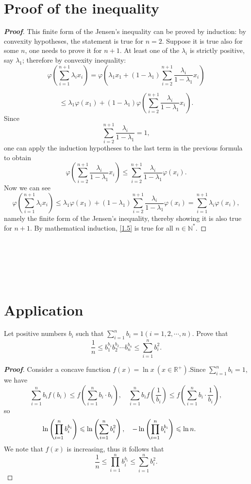 \documentclass{memoir}
\begin{document}
\section{Proof of the inequality}
\begin{proof}[\textbf{Proof}]
This finite form of the Jensen's inequality can be proved by induction: by convexity hypotheses, the statement is true for $n = 2$. Suppose it is true also for some $n$, one needs to prove it for $n+1$. At least one of the $\lambda_i$ is strictly positive, say $\lambda_1$; therefore by convexity inequality:
\[\varphi \left(\sum_{i=1}^{n+1} \lambda_i x_i \right) = \varphi\left(\lambda_1x_1+(1-\lambda _{1})\sum \limits^{n+1}_{i=2}\frac{\lambda _{i}}{1-\lambda _{1}} x_{i}\right)\]

\[\leqslant \lambda_1\varphi(x_1)+(1-\lambda _{1})\varphi\left(\sum \limits^{n+1}_{i=2}\frac{\lambda _{i}}{1-\lambda _{1}} x_{i}\right).\]
Since
\[\sum \limits^{n+1}_{i=2}\frac{\lambda _{i}}{1-\lambda _{1}} =1,\]
one can apply the induction hypotheses to the last term in the previous formula to obtain
\[\varphi\left(\sum \limits^{n+1}_{i=2}\frac{\lambda _{i}}{1-\lambda _{1}} x_{i}\right)\leqslant
\sum\limits^{n+1}_{i=2}\frac{\lambda _{i}}{1-\lambda _{1}}\varphi\left(x_{i}\right).
\]
Now we can see
\[
\varphi \left(\sum_{i=1}^{n+1} \lambda_i x_i \right)\leqslant
\lambda_1\varphi(x_1)+(1-\lambda _{1})\sum\limits^{n+1}_{i=2}\frac{\lambda _{i}}{1-\lambda _{1}}\varphi\left(x_{i}\right)=
\sum_{i=1}^{n+1} \lambda_i\varphi \left( x_i \right),
\]
 namely the finite form of the Jensen's inequality, thereby showing it is also true for $n+1$. By mathematical induction, \autoref{1.5} is true for all $n\in\mathbb{N^*}$.
\end{proof}
\par \ 
\par \ 
\par \ 


\section{Application}
\begin{example}
	Let positive numbers $ b_i  $ such that $ \sum\limits_{i=1}^{n}b_i=1 (i=1,2,\cdots,n)$. Prove that 
	\[
	\frac{1}{n}\leqslant  b_1^{b_{1}}b_{2}^{b_{2}}\cdots b_{n}^{b_{n}}\leqslant \sum_{i=1}^{n}b_{i}^{2}.
	\] 
\end{example}
\begin{proof}[\textbf{Proof}]
	Consider a concave function $f(x)=\ln x \ (x\in \mathbb{R^{+}})$.Since $ \sum\limits_{i=1}^{n}b_i=1 $, we have
	\[\sum_{i=1}^{n}b_{i}f(b_{i})\leqslant f\left(\sum_{i=1}^{n}b_i\cdot b_i\right),\quad \sum_{i=1}^{n}b_{i}f(\frac{1}{b_{i}})\leqslant f\left(\sum_{i=1}^{n}b_i\cdot \frac{1}{b_{i}}\right),\]
	so
	\[\ln\left(\prod_{i=1}^{n}b_{i}^{b_i}\right)\leqslant  \ln\left(\sum_{i=1}^{n}b_i^2\right),\quad   -\ln\left(\prod_{i=1}^{n}b_{i}^{b_i}\right)\leqslant \ln n.\rule{0.7cm}{0ex}\]
	We note that $f(x)$ is increasing, thus it follows that
	\[
	\frac{1}{n}\leqslant \prod_{i=1}^{n}b_{i}^{b_i} \leqslant \sum_{i=1}^{n}b_{i}^{2}.
	\] 
\end{proof}
\par \ \par \ 
\end{document}
